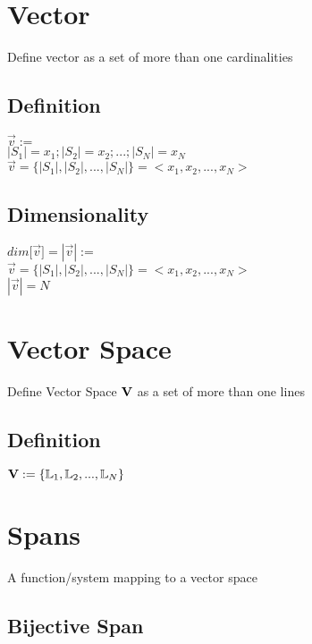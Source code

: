 \documentclass[11pt]{article}
\begin{document}
\section{Vector}
Define vector as a set of more than one cardinalities

\subsection{Definition}
\begin{center}
$\vec{v} :=$
\\ \vspace{2mm}
$|S_1| = x_1; |S_2| = x_2;...;|S_N| = x_N$
\\ \vspace{2mm}
$\vec{v} = \{|S_1|,|S_2|,...,|S_N|\} = <x_1,x_2,...,x_N>$
\end{center}

\subsection{Dimensionality}
\begin{center}
$
dim \lbrack \vec{v} \rbrack = |\vec{v}| :=
$
\\ \vspace{2mm}
$
\vec{v} = \{|S_1|,|S_2|,...,|S_N|\} = <x_1,x_2,...,x_N>
$
\\ \vspace{2mm}
$
| \vec{v} | = N
$
\end{center}



\section{Vector Space}
Define Vector Space $\bold{V}$ as a set of more than one lines
\subsection{Definition}
\begin{center}
$\bold{V} := \{ \mathbb{L}_1,\mathbb{L}_2,...,\mathbb{L}_N\}$
\end{center}



\section{Spans}
A function/system mapping to a vector space

\subsection{Bijective Span}
\end{document}
